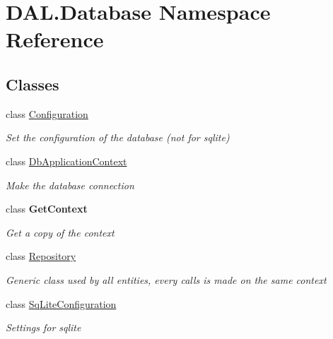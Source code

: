 \hypertarget{namespace_d_a_l_1_1_database}{}\section{D\+A\+L.\+Database Namespace Reference}
\label{namespace_d_a_l_1_1_database}
\subsection*{Classes}
\begin{DoxyCompactItemize}
\item 
class \hyperlink{class_d_a_l_1_1_database_1_1_configuration}{Configuration}
\begin{DoxyCompactList}\small\item\em Set the configuration of the database (not for sqlite) \end{DoxyCompactList}\item 
class \hyperlink{class_d_a_l_1_1_database_1_1_db_application_context}{Db\+Application\+Context}
\begin{DoxyCompactList}\small\item\em Make the database connection \end{DoxyCompactList}\item 
class {\bfseries Get\+Context}
\begin{DoxyCompactList}\small\item\em Get a copy of the context \end{DoxyCompactList}\item 
class \hyperlink{class_d_a_l_1_1_database_1_1_repository}{Repository}
\begin{DoxyCompactList}\small\item\em Generic class used by all entities, every calls is made on the same context \end{DoxyCompactList}\item 
class \hyperlink{class_d_a_l_1_1_database_1_1_sq_lite_configuration}{Sq\+Lite\+Configuration}
\begin{DoxyCompactList}\small\item\em Settings for sqlite \end{DoxyCompactList}\end{DoxyCompactItemize}
